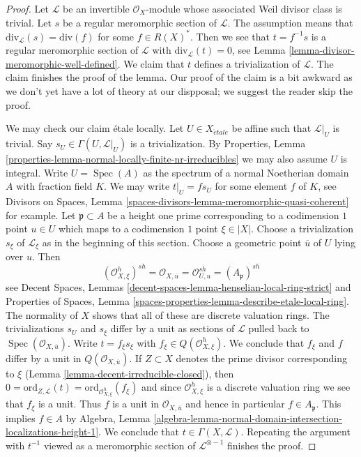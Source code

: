 \documentclass{stacks-project}
\theoremstyle{plain}
\theoremstyle{definition}
\theoremstyle{remark}
\numberwithin{equation}{subsection}
\def\Spec{\mathop{\mathrm{Spec}}}
\def\etale{{\acute{e}tale}}
\begin{document}
\begin{proof}
Let $\mathcal{L}$ be an invertible $\mathcal{O}_X$-module whose
associated Weil divisor class is trivial. Let $s$ be a regular
meromorphic section of $\mathcal{L}$. The assumption means that
$\text{div}_\mathcal{L}(s) = \text{div}(f)$ for some
$f \in R(X)^*$. Then we see that $t = f^{-1}s$ is a regular
meromorphic section of $\mathcal{L}$ with
$\text{div}_\mathcal{L}(t) = 0$, see
Lemma \ref{lemma-divisor-meromorphic-well-defined}.
We claim that $t$ defines a trivialization of $\mathcal{L}$.
The claim finishes the proof of the lemma.
Our proof of the claim is a bit awkward as we
don't yet have a lot of theory at our dispposal; we suggest
the reader skip the proof.

\medskip\noindent
We may check our claim \'etale locally. Let $U \in X_\etale$ be affine
such that $\mathcal{L}|_U$ is trivial. Say $s_U \in \Gamma(U, \mathcal{L}|_U)$
is a trivialization. By
Properties, Lemma \ref{properties-lemma-normal-locally-finite-nr-irreducibles}
we may also assume $U$ is integral. Write $U = \Spec(A)$ as the spectrum of a
normal Noetherian domain $A$ with fraction field $K$.
We may write $t|_U = f s_U$ for some element $f$ of $K$, see
Divisors on Spaces, Lemma \ref{spaces-divisors-lemma-meromorphic-quasi-coherent}
for example. Let $\mathfrak p \subset A$ be a height one prime
corresponding to a codimension $1$ point $u \in U$ which maps
to a codimension $1$ point $\xi \in |X|$. Choose a trivialization
$s_\xi$ of $\mathcal{L}_\xi$ as in the beginning of this section.
Choose a geometric point $\overline{u}$ of $U$ lying over $u$.
Then
$$
(\mathcal{O}_{X, \xi}^h)^{sh} =
\mathcal{O}_{X, \overline{u}} =
\mathcal{O}_{U, u}^{sh} = (A_\mathfrak p)^{sh}
$$
see Decent Spaces, Lemmas
\ref{decent-spaces-lemma-henselian-local-ring-strict}
and
Properties of Spaces, Lemma
\ref{spaces-properties-lemma-describe-etale-local-ring}.
The normality of $X$ shows that all of these are
discrete valuation rings. The trivializations $s_U$ and $s_\xi$
differ by a unit as sections of $\mathcal{L}$ pulled back to
$\Spec(\mathcal{O}_{X, \overline{u}})$.
Write $t = f_\xi s_\xi$ with $f_\xi \in Q(\mathcal{O}_{X, \xi}^h)$.
We conclude that $f_\xi$ and $f$ differ by a unit
in $Q(\mathcal{O}_{X, \overline{u}})$.
If $Z \subset X$ denotes the prime divisor corresponding to $\xi$
(Lemma \ref{lemma-decent-irreducible-closed}), then
$0 = \text{ord}_{Z, \mathcal{L}}(t) =
\text{ord}_{\mathcal{O}_{X, \xi}^h}(f_\xi)$
and since $\mathcal{O}_{X, \xi}^h$ is a discrete valuation ring
we see that $f_\xi$ is a unit.
Thus $f$ is a unit in $\mathcal{O}_{X, \overline{u}}$
and hence in particular $f \in A_\mathfrak p$.
This implies $f \in A$ by Algebra, Lemma
\ref{algebra-lemma-normal-domain-intersection-localizations-height-1}.
We conclude that $t \in \Gamma(X, \mathcal{L})$.
Repeating the argument with $t^{-1}$ viewed as a meromorphic
section of $\mathcal{L}^{\otimes -1}$ finishes the proof.
\end{proof}
\end{document}
